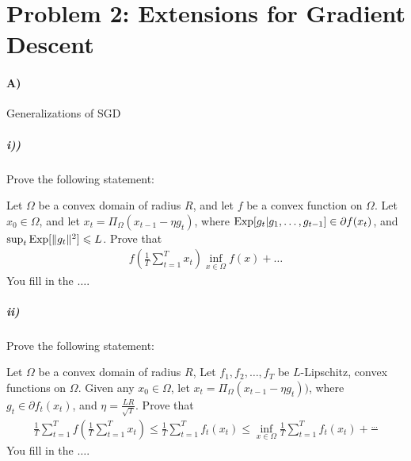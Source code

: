 \documentclass[12pt]{article}
\begin{document}
\section*{Problem 2: Extensions for Gradient Descent}
\paragraph{A)} Generalizations of SGD
\subparagraph{i))} Prove the following statement:
\begin{proposition*} Let $\Omega$ be a convex domain of radius $R$, and let $f$ be a convex function on $\Omega$. Let $x_0 \in \Omega$, and let $x_{t} = \Pi_{\Omega}(x_{t-1} - \eta g_t )$, where $\mathrm{Exp}[g_t | g_1,\dots,g_{t-1}] \in \partial f(x_t)$, and $\sup_{t} \mathrm{Exp}[\|g_t\|^2] \leqslant L$.  Prove that 
\begin{eqnarray}
 f(\frac{1}{T}\sum_{t=1}^T x_t) \inf_{x \in \Omega} f(x) + \dots
\end{eqnarray}
You fill in the $\dots$.
\end{proposition*}
\subparagraph{ii)} Prove the following statement:
\begin{proposition*}  Let $\Omega$ be a convex domain of radius $R$, Let $f_1,f_2,\dots,f_T$ be $L$-Lipschitz, convex functions on $\Omega$. Given any $x_0 \in \Omega$, let $x_{t} = \Pi_{\Omega}(x_{t-1} - \eta g_t ))$, where $g_t \in \partial f_t(x_t)$, and  $\eta = \frac{LR}{\sqrt{T}}$. Prove that
\begin{eqnarray}
\frac{1}{T}\sum_{t=1}^{T} f(\frac{1}{T}\sum_{t=1}^T x_t) \le \frac{1}{T}\sum_{t=1}^Tf_t(x_t) \le \inf_{x \in \Omega}\frac{1}{T}\sum_{t=1}^Tf_t(x_t) + \frac{\dots}{}
\end{eqnarray}
You fill in the $\dots$.
\end{proposition*}
\end{document}
